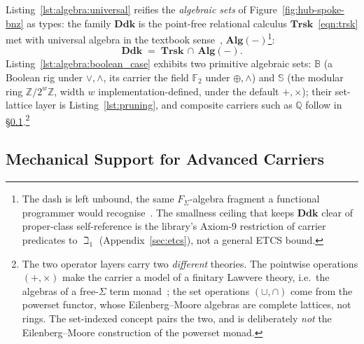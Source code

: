 \documentclass[11pt, a4paper]{article}
\begin{document}
Listing~\ref{lst:algebra:universal} reifies the \emph{algebraic sets} of Figure~\ref{fig:hub-spoke-bnz} as  types: the family $\mathbf{Ddk}$ is the point-free relational calculus $\mathbf{Trsk}$~\eqref{eqn:trsk} met with universal algebra in the textbook sense~\cite{burris1981universalalgebra}, $\mathbf{Alg}(-)$\footnote{The dash is left unbound, the same $F_\Sigma$-algebra fragment a functional programmer would recognise~\cite{pierce1991basic}.  The smallness ceiling that keeps $\mathbf{Ddk}$ clear of proper-class self-reference is the library's Axiom-9 restriction of carrier predicates to $\beth_1$ (Appendix~\ref{sec:etcs}), not a general ETCS bound.}:
\begin{equation}
\label{eqn:ddk}
    \mathbf{Ddk} \;=\; \mathbf{Trsk} \,\cap\, \mathbf{Alg}(-).
\end{equation}
Listing~\ref{lst:algebra:boolean_case} exhibits two primitive algebraic sets: $\mathbb{B}$ (a Boolean rig under $\vee,\wedge$, its carrier the field $\mathbb{F}_2$ under $\oplus,\wedge$) and $\mathbb{S}$ (the modular ring $\mathbb{Z}/2^{w}\mathbb{Z}$, width $w$ implementation-defined, under the default $+,\times$); their set-lattice layer is Listing~\ref{lst:pruning}, and composite carriers such as $\mathbb{Q}$ follow in \S\ref{sec:hsp_varieties}.\footnote{The two operator layers carry two \emph{different} theories.  The pointwise operations $(+,\times)$ make the carrier a model of a finitary Lawvere theory, i.e.\ the algebras of a free-$\Sigma$ term monad~\cite{hylandpower2007}; the set operations $(\cup,\cap)$ come from the powerset functor, whose Eilenberg--Moore algebras are complete lattices, not rings.  The set-indexed concept pairs the two, and is deliberately \emph{not} the Eilenberg--Moore construction of the powerset monad.}

\subsection{Mechanical Support for Advanced Carriers}
\label{sec:hsp_varieties}
\label{sec:carrier-lattice}
\end{document}
